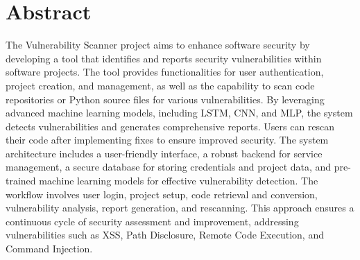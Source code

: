 \chapter*{Abstract}
The Vulnerability Scanner project aims to enhance software security by developing a tool that identifies and reports security vulnerabilities within software projects. 
The tool provides functionalities for user authentication, project creation, and management, as well as the capability to scan code repositories or Python source files for various vulnerabilities. 
By leveraging advanced machine learning models, including LSTM, CNN, and MLP, the system detects vulnerabilities and generates comprehensive reports. 
Users can rescan their code after implementing fixes to ensure improved security. 
The system architecture includes a user-friendly interface, a robust backend for service management, a secure database for storing credentials and project data, and pre-trained machine learning models for effective vulnerability detection. 
The workflow involves user login, project setup, code retrieval and conversion, vulnerability analysis, report generation, and rescanning. 
This approach ensures a continuous cycle of security assessment and improvement, addressing vulnerabilities such as XSS, Path Disclosure, Remote Code Execution, and Command Injection.